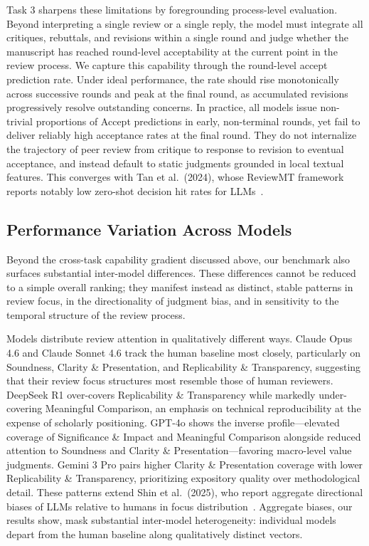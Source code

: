 \documentclass[preprint,10pt,times]{elsarticle}
\begin{document}
Task 3 sharpens these limitations by foregrounding process-level evaluation. Beyond interpreting a single review or a single reply, the model must integrate all critiques, rebuttals, and revisions within a single round and judge whether the manuscript has reached round-level acceptability at the current point in the review process. We capture this capability through the round-level accept prediction rate. Under ideal performance, the rate should rise monotonically across successive rounds and peak at the final round, as accumulated revisions progressively resolve outstanding concerns. In practice, all models issue non-trivial proportions of Accept predictions in early, non-terminal rounds, yet fail to deliver reliably high acceptance rates at the final round. They do not internalize the trajectory of peer review from critique to response to revision to eventual acceptance, and instead default to static judgments grounded in local textual features. This converges with Tan et al.\ (2024), whose ReviewMT framework reports notably low zero-shot decision hit rates for LLMs~\cite{ref45}.

\subsection{Performance Variation Across Models}
\label{sec:model-var}

Beyond the cross-task capability gradient discussed above, our benchmark also surfaces substantial inter-model differences. These differences cannot be reduced to a simple overall ranking; they manifest instead as distinct, stable patterns in review focus, in the directionality of judgment bias, and in sensitivity to the temporal structure of the review process.

Models distribute review attention in qualitatively different ways. Claude Opus 4.6 and Claude Sonnet 4.6 track the human baseline most closely, particularly on Soundness, Clarity \& Presentation, and Replicability \& Transparency, suggesting that their review focus structures most resemble those of human reviewers. DeepSeek R1 over-covers Replicability \& Transparency while markedly under-covering Meaningful Comparison, an emphasis on technical reproducibility at the expense of scholarly positioning. GPT-4o shows the inverse profile---elevated coverage of Significance \& Impact and Meaningful Comparison alongside reduced attention to Soundness and Clarity \& Presentation---favoring macro-level value judgments. Gemini 3 Pro pairs higher Clarity \& Presentation coverage with lower Replicability \& Transparency, prioritizing expository quality over methodological detail. These patterns extend Shin et al.\ (2025), who report aggregate directional biases of LLMs relative to humans in focus distribution~\cite{ref26}. Aggregate biases, our results show, mask substantial inter-model heterogeneity: individual models depart from the human baseline along qualitatively distinct vectors.
\end{document}
